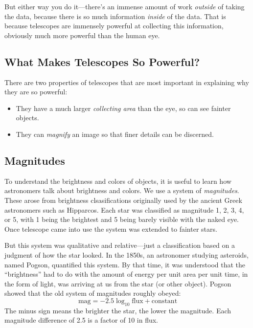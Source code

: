 \documentclass[12pt, preprint]{aastex}
\begin{document}
But either way you do it---there's an immense amount of work {\it
  outside} of taking the data, because there is so much information
{\it inside} of the data. That is because telescopes are immensely
powerful at collecting this information, obviously much more powerful
than the human eye.

\subsection{What Makes Telescopes So Powerful?}

There are two properties of telescopes that are most important in
explaining why they are so powerful:
\begin{itemize}
\item They have a much larger {\it collecting area} than the eye, so
  can see fainter objects.
\item They can {\it magnify} an image so that finer details can be
  discerned. 
\end{itemize}

\subsection{Magnitudes}

To understand the brightness and colors of objects, it is useful to
learn how astronomers talk about brightness and colors. We use a
system of {\it magnitudes}. These arose from brightness
clsasifications originally used by the ancient Greek astronomers such
as Hipparcos. Each star was classified as magnitude 1, 2, 3, 4, or 5,
with 1 being the brightest and 5 being barely visible with the naked
eye. Once telescope came into use the system was extended to fainter
stars.

But this system was qualitative and relative---just a classification
based on a judgment of how the star looked. In the 1850s, an
astronomer studying asteroids, named Pogson, quantified this
system. By that time, it was understood that the ``brightness'' had to
do with the amount of energy per unit area per unit time, in the form
of light, was arriving at us from the star (or other object). Pogson
showed that the old system of magnitudes roughly obeyed:
\begin{equation}
\label{eq:mag}
\mathrm{mag} = - 2.5 \log_{10} \mathrm{flux} + \mathrm{constant}
\end{equation}
The minus sign means the brighter the star, the lower the
magnitude. Each magnitude difference of 2.5 is a factor of 10 in flux.
\end{document}
